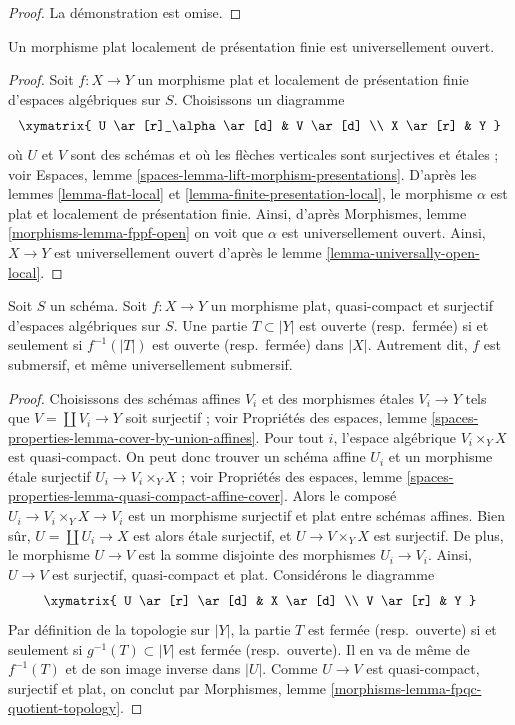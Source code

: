 \begin{proof}
La démonstration est omise.
\end{proof}

\begin{lemma}
\label{lemma-fppf-open}
Un morphisme plat localement de présentation finie est universellement ouvert.
\end{lemma}

\begin{proof}
Soit $f : X \to Y$ un morphisme plat et localement de présentation finie
d'espaces algébriques sur $S$. Choisissons un diagramme
$$
\xymatrix{
U \ar[r]_\alpha \ar[d] & V \ar[d] \\
X \ar[r] & Y
}
$$
où $U$ et $V$ sont des schémas et où les flèches verticales sont surjectives et
étales ; voir
Espaces, lemme \ref{spaces-lemma-lift-morphism-presentations}.
D'après les
lemmes \ref{lemma-flat-local} et \ref{lemma-finite-presentation-local},
le morphisme $\alpha$ est plat et localement de présentation finie.
Ainsi, d'après
Morphismes, lemme \ref{morphisms-lemma-fppf-open}
on voit que $\alpha$ est universellement ouvert.
Ainsi, $X \to Y$ est universellement ouvert d'après le
lemme \ref{lemma-universally-open-local}.
\end{proof}

\begin{lemma}
\label{lemma-fpqc-quotient-topology}
Soit $S$ un schéma.
Soit $f : X \to Y$ un morphisme plat, quasi-compact et surjectif
d'espaces algébriques sur $S$.
Une partie $T \subset |Y|$ est ouverte (resp.\ fermée) si et seulement si
$f^{-1}(|T|)$ est ouverte (resp.\ fermée) dans $|X|$.
Autrement dit, $f$ est submersif, et même universellement submersif.
\end{lemma}

\begin{proof}
Choisissons des schémas affines $V_i$ et des morphismes étales $V_i \to Y$ tels que
$V = \coprod V_i \to Y$ soit surjectif ; voir
Propriétés des espaces,
lemme \ref{spaces-properties-lemma-cover-by-union-affines}.
Pour tout $i$, l'espace algébrique $V_i \times_Y X$ est quasi-compact.
On peut donc trouver un schéma affine $U_i$ et un morphisme étale surjectif
$U_i \to V_i \times_Y X$ ; voir
Propriétés des espaces,
lemme \ref{spaces-properties-lemma-quasi-compact-affine-cover}.
Alors le composé $U_i \to V_i \times_Y X \to V_i$ est un morphisme surjectif
et plat entre schémas affines.
Bien sûr, $U = \coprod U_i \to X$ est alors étale surjectif,
et $U \to V \times_Y X$ est surjectif. De plus, le morphisme $U \to V$ est la
somme disjointe des morphismes $U_i \to V_i$. Ainsi, $U \to V$ est surjectif,
quasi-compact et plat. Considérons le diagramme
$$
\xymatrix{
U \ar[r] \ar[d] & X \ar[d] \\
V \ar[r] & Y
}
$$
Par définition de la topologie sur $|Y|$, la partie $T$ est fermée
(resp.\ ouverte) si et seulement si $g^{-1}(T) \subset |V|$ est fermée
(resp.\ ouverte). Il en va de même de
$f^{-1}(T)$ et de son image inverse dans $|U|$.
Comme $U \to V$ est quasi-compact, surjectif et plat, on conclut par
Morphismes, lemme \ref{morphisms-lemma-fpqc-quotient-topology}.
\end{proof}

